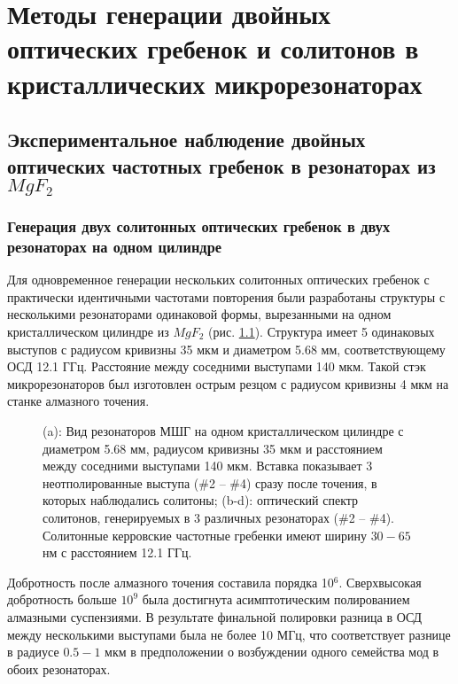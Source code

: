 \chapter{Методы генерации двойных оптических гребенок и солитонов в кристаллических микрорезонаторах} \label{chapt4}

\section{Экспериментальное наблюдение двойных оптических частотных гребенок в резонаторах из $MgF_2$}

\subsection{Генерация двух солитонных оптических гребенок в двух резонаторах на одном цилиндре}

Для одновременное генерации нескольких солитонных оптических гребенок \cite{Pavlov2017} с практически идентичными частотами повторения были разработаны структуры с несколькими резонаторами одинаковой формы, вырезанными на одном кристаллическом цилиндре из $MgF_2$ (рис. \ref{ris:image1}). Структура имеет 5 одинаковых выступов с радиусом кривизны 35 мкм и диаметром 5.68 мм, соответствующему ОСД 12.1 ГГц. Расстояние между соседними выступами 140 мкм. Такой стэк микрорезонаторов был изготовлен острым резцом с радиусом кривизны 4 мкм на станке алмазного точения.

\begin{figure}[ht]
\begin{minipage}[ht]{1\linewidth}
\end{minipage}
\caption{ (a): Вид резонаторов МШГ на одном кристаллическом цилиндре с диаметром 5.68 мм, радиусом кривизны 35 мкм и расстоянием между соседними выступами 140 мкм. Вставка показывает 3 неотполированные выступа (\#2 -- \#4) сразу после точения, в которых наблюдались солитоны; (b-d): оптический спектр солитонов, генерируемых в 3 различных резонаторах (\#2 -- \#4). Солитонные керровские частотные гребенки имеют ширину $30 - 65$ нм с расстоянием 12.1 ГГц.}
\label{ris:image1}
\end{figure}

Добротность после алмазного точения составила порядка 10$^6$. Сверхвысокая добротность больше $10^9$ была достигнута асимптотическим полированием алмазными суспензиями. В результате финальной полировки разница в ОСД между несколькими выступами была не более 10 МГц, что соответствует разнице в радиусе $0.5 - 1$ мкм в предположении о возбуждении одного семейства мод в обоих резонаторах.

